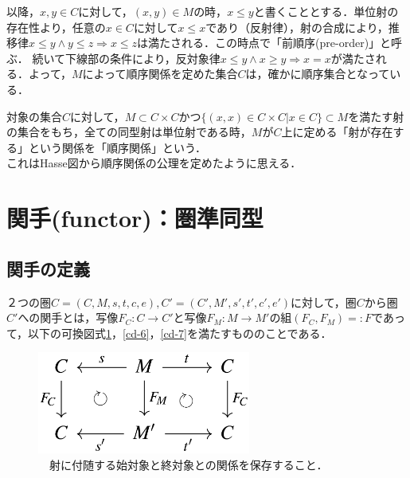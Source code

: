 \documentclass[uplatex, 12pt, a4paper, dvipdfmx]{jsarticle}
\begin{document}
以降，$x,y\in C$に対して，$(x,y)\in M$の時，$x\le y$と書くこととする．単位射の存在性より，任意の$x\in C$に対して$x\le x$であり（反射律），射の合成により，推移律$x\le y \wedge y\le z \Longrightarrow x\le z$は満たされる．この時点で「前順序(pre-order)」と呼ぶ．
続いて下線部の条件により，反対象律$x\le y \wedge x\ge y \Longrightarrow x=x$が満たされる．よって，$M$によって順序関係を定めた集合$C$は，確かに順序集合となっている．

\begin{screen}
    対象の集合$C$に対して，$M\subset C\times C$かつ$\{ (x,x) \in C\times C | x\in C \}\subset M$を満たす射の集合をもち，全ての同型射は単位射である時，$M$が$C$上に定める「射が存在する」という関係を「順序関係」という．\\
    これはHasse図から順序関係の公理を定めたように思える．
\end{screen}

\clearpage
\section{関手(functor)：圏準同型}

\subsection{関手の定義}

\begin{shadebox}\begin{definition}[関手]
    ２つの圏$C=(C,M,s,t,c,e),C'=(C',M',s',t',c',e')$に対して，圏$C$から圏$C'$への関手とは，写像$F_C:C\longrightarrow C'$と写像$F_M:M\longrightarrow M'$の組$(F_C,F_M)=:F$であって，以下の可換図式\ref{cd-5}，\ref{cd-6}，\ref{cd-7}を満たすもののことである．
\end{definition}\end{shadebox}

\begin{figure}[ht]\begin{center} \caption{\label{cd-5}　射に付随する始対象と終対象との関係を保存すること．}
    \includegraphics[width=7cm]{cd-5.png}
\end{center}\end{figure}
\end{document}
